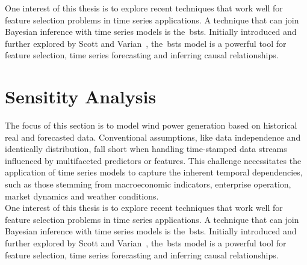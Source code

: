     One interest of this thesis is to explore recent techniques that work well for feature selection problems in
    time series applications.
    A technique that can join Bayesian inference with time series models is the~\gls{bsts}.
    Initially introduced and further explored by Scott and Varian~\cite{scott_predicting_2013, scott_bayesian_2013},
    the~\gls{bsts} model is a powerful tool for feature selection, time series forecasting and inferring causal relationships. \\


\section{Sensitity Analysis}
    \label{sec:sens_analysis}

    The focus of this section is to model wind power generation based on historical real and forecasted data.
    Conventional assumptions, like data independence and identically distribution, fall short when handling time-stamped
    data streams influenced by multifaceted predictors or features.
    This challenge necessitates the application of time series models to capture the inherent temporal dependencies,
    such as those stemming from macroeconomic indicators, enterprise operation, market dynamics and weather conditions.\\

    One interest of this thesis is to explore recent techniques that work well for feature selection problems in
    time series applications.
    A technique that can join Bayesian inference with time series models is the~\gls{bsts}.
    Initially introduced and further explored by Scott and Varian~\cite{scott_predicting_2013, scott_bayesian_2013},
    the~\gls{bsts} model is a powerful tool for feature selection, time series forecasting and inferring causal relationships. \\




